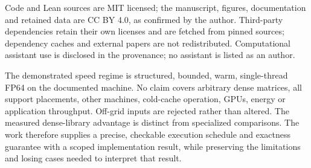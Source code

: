 \documentclass[10pt,a4paper]{article}
\begin{document}
Code and Lean sources are MIT licensed; the manuscript, figures, documentation
and retained data are CC BY 4.0, as confirmed by the author. Third-party
dependencies retain their own licenses and are fetched from pinned sources;
dependency caches and external papers are not redistributed. Computational
assistant use is disclosed in the provenance; no assistant is listed as an author.

The demonstrated speed regime is structured, bounded, warm, single-thread
FP64 on the documented machine. No claim covers arbitrary dense matrices,
all support placements, other machines, cold-cache operation, GPUs, energy
or application throughput. Off-grid inputs are rejected rather than altered.
The measured dense-library advantage is distinct from specialized comparisons.
The work therefore supplies a precise, checkable execution schedule and
exactness guarantee with a scoped implementation result, while preserving
the limitations and losing cases needed to interpret that result.



\end{document}
